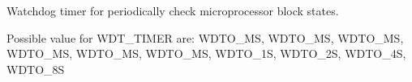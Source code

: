 Watchdog timer for periodically check microprocessor block states. 

Possible value for W\+D\+T\+\_\+\+T\+I\+M\+ER are\+: W\+D\+T\+O\+\_\+MS, W\+D\+T\+O\+\_\+MS, W\+D\+T\+O\+\_\+MS, W\+D\+T\+O\+\_\+MS, W\+D\+T\+O\+\_\+MS, W\+D\+T\+O\+\_\+MS, W\+D\+T\+O\+\_\+1S, W\+D\+T\+O\+\_\+2S, W\+D\+T\+O\+\_\+4S, W\+D\+T\+O\+\_\+8S 